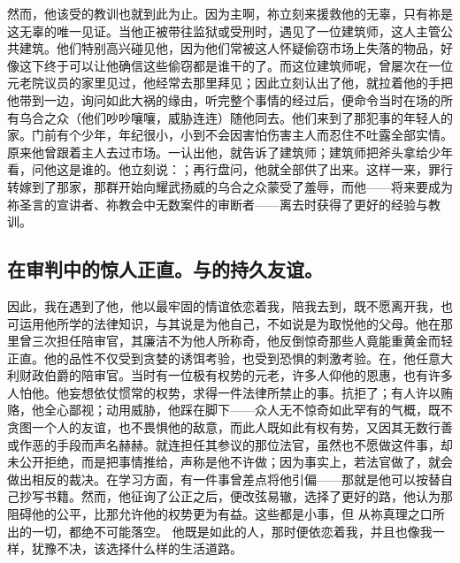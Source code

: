 然而，他该受的教训也就到此为止。因为主啊，祢立刻来援救他的无辜，只有祢是这无辜的唯一见证。当他正被带往监狱或受刑时，遇见了一位建筑师，这人主管公共建筑。他们特别高兴碰见他，因为他们常被这人怀疑偷窃市场上失落的物品，好像这下终于可以让他确信这些偷窃都是谁干的了。而这位建筑师呢，曾屡次在一位元老院议员的家里见过，他经常去那里拜见；因此立刻认出了他，就拉着他的手把他带到一边，询问如此大祸的缘由，听完整个事情的经过后，便命令当时在场的所有乌合之众（他们吵吵嚷嚷，威胁连连）随他同去。他们来到了那犯事的年轻人的家。门前有个少年，年纪很小，小到不会因害怕伤害主人而忍住不吐露全部实情。原来他曾跟着主人去过市场。一认出他，就告诉了建筑师；建筑师把斧头拿给少年看，问他这是谁的。他立刻说：；再行盘问，他就全部供了出来。这样一来，罪行转嫁到了那家，那群开始向耀武扬威的乌合之众蒙受了羞辱，而他——将来要成为祢圣言的宣讲者、祢教会中无数案件的审断者——离去时获得了更好的经验与教训。\par


\subsection{在审判中的惊人正直。与的持久友谊。}

因此，我在遇到了他，他以最牢固的情谊依恋着我，陪我去到，既不愿离开我，也可运用他所学的法律知识，与其说是为他自己，不如说是为取悦他的父母。他在那里曾三次担任陪审官，其廉洁不为他人所称奇，他反倒惊奇那些人竟能重黄金而轻正直。他的品性不仅受到贪婪的诱饵考验，也受到恐惧的刺激考验。在，他任意大利财政伯爵的陪审官。当时有一位极有权势的元老，许多人仰他的恩惠，也有许多人怕他。他妄想依仗惯常的权势，求得一件法律所禁止的事。抗拒了；有人许以贿赂，他全心鄙视；动用威胁，他踩在脚下——众人无不惊奇如此罕有的气概，既不贪图一个人的友谊，也不畏惧他的敌意，而此人既如此有权有势，又因其无数行善或作恶的手段而声名赫赫。就连担任其参议的那位法官，虽然也不愿做这件事，却未公开拒绝，而是把事情推给，声称是他不许做；因为事实上，若法官做了，就会做出相反的裁决。在学习方面，有一件事曾差点将他引偏——那就是他可以按替自己抄写书籍。然而，他征询了公正之后，便改弦易辙，选择了更好的路，他认为那阻碍他的公平，比那允许他的权势更为有益。这些都是小事，但 从祢真理之口所出的一切，都绝不可能落空。 他既是如此的人，那时便依恋着我，并且也像我一样，犹豫不决，该选择什么样的生活道路。\par

